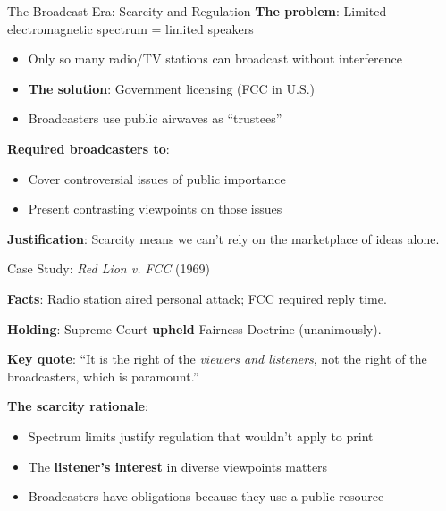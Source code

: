 ﻿\documentclass[aspectratio=169,11pt]{beamer}
\begin{document}
\begin{frame}{The Broadcast Era: Scarcity and Regulation}
\textbf{The problem}: Limited electromagnetic spectrum = limited speakers

\begin{itemize}
    \item Only so many radio/TV stations can broadcast without interference
    \item \textbf{The solution}: Government licensing (FCC in U.S.)
    \item Broadcasters use public airwaves as ``trustees''
\end{itemize}

\vspace{0.3cm}
\begin{casestudybox}
\textbf{Required broadcasters to}:
\begin{itemize}
    \item Cover controversial issues of public importance
    \item Present contrasting viewpoints on those issues
\end{itemize}
\textbf{Justification}: Scarcity means we can't rely on the marketplace of ideas alone.
\end{casestudybox}
\end{frame}

\begin{frame}{Case Study: \textit{Red Lion v. FCC} (1969)}
\begin{casestudybox}
\textbf{Facts}: Radio station aired personal attack; FCC required reply time.

\textbf{Holding}: Supreme Court \textbf{upheld} Fairness Doctrine (unanimously).

\textbf{Key quote}: ``It is the right of the \textit{viewers and listeners}, not the right of the broadcasters, which is paramount.''
\end{casestudybox}

\vspace{0.3cm}
\textbf{The scarcity rationale}:
\begin{itemize}
    \item Spectrum limits justify regulation that wouldn't apply to print
    \item The \textbf{listener's interest} in diverse viewpoints matters
    \item Broadcasters have obligations because they use a public resource
\end{itemize}
\end{frame}
\end{document}
